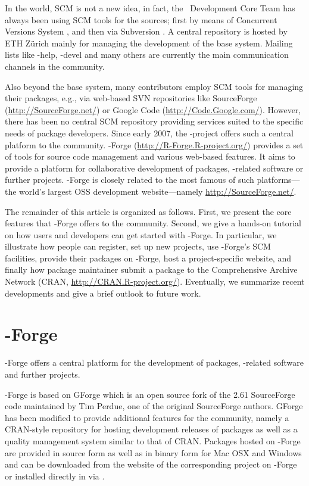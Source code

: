 In the \R{} world, SCM is not a new idea, in fact, the \R{}~Development
Core Team has always been using SCM tools for the \R{} sources; first by means of
Concurrent Versions System \citep[CVS, see][]{forge:Cederqvist:2006},
and then via Subversion \citep[SVN, see][]{forge:Pilato+Collins-Sussman+Fitzpatrick:2004}.
A central repository is hosted by ETH Z\"urich mainly for
managing the development of the base \R{} system. Mailing lists like
\R{}-help, \R{}-devel and many others are currently the main communication
channels in the \R{} community.

Also beyond the base system, many \R{} contributors employ
SCM tools for managing their \R{} packages, e.g., via web-based
SVN repositories like SourceForge (\url{http://SourceForge.net/})
or Google Code (\url{http://Code.Google.com/}). However, there has been
no central SCM repository providing services suited to the specific
needs of \R{} package developers.
Since early 2007, the \R{}-project offers such a central platform to the \R{}
community. \R{}-Forge (\url{http://R-Forge.R-project.org/}) provides a set
of tools for source code management and various web-based
features. It aims to provide a platform for collaborative development of
\R{} packages, \R{}-related software or further projects. \R{}-Forge is
closely related to the most famous of such platforms---the 
world's largest OSS development website---namely
\url{http://SourceForge.net/}.

The remainder of this article is organized as follows. First, we present the core
features that \R{}-Forge offers to the \R{} community. Second, we
give a hands-on tutorial on how users and developers can get started with 
\R{}-Forge. In particular, we illustrate how people
can register, set up new projects, use \R{}-Forge's SCM
facilities, provide their packages on \R{}-Forge, host a project-specific website, and
finally how package maintainer submit a package to the Comprehensive \R{}
Archive Network (CRAN, \url{http://CRAN.R-project.org/}).
Eventually, we summarize recent developments and give a brief outlook
to future work.


\section{\R{}-Forge}
\R{}-Forge offers a central platform for the development of \R{}
packages, \R{}-related software and further projects. 

\R{}-Forge is based on GForge \citep{forge:copeland_et_al:2006} which is
an open source fork of the 2.61 SourceForge code maintained by Tim
Perdue, one of the original SourceForge authors. GForge has been
modified to provide additional features for the \R{} community, namely
a CRAN-style repository for hosting development releases of \R{}
packages as well as a quality management system similar to that of
CRAN.
Packages hosted on \R{}-Forge are provided in source form as well as
in binary form for Mac OSX and Windows and can be downloaded from the
website of the corresponding project on \R{}-Forge or installed
directly in \R{} via
.

